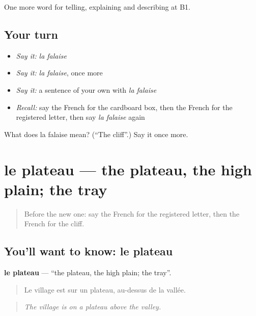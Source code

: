 \begin{grammarlens}[title={What you've built}]
One more word for telling, explaining and describing at B1.
\end{grammarlens}

\subsection*{Your turn}
\begin{itemize}
\raggedright
  \item \emph{Say it:} \emph{la falaise}
  \item \emph{Say it:} \emph{la falaise}, once more
  \item \emph{Say it:} a sentence of your own with \emph{la falaise}
  \item \emph{Recall:} say the French for the cardboard box, then the French for the registered letter, then say \emph{la falaise} again
\end{itemize}

\begin{tcolorbox}[breakable,colback=teal!4,colframe=teal!35!black,title={Before you move on}]
What does la falaise mean? (\textquotedblleft{}The cliff\textquotedblright{}.) Say it once more.
\end{tcolorbox}
\section[le plateau]{le plateau — the plateau, the high plain; the tray}

\label{lesson:FR-C454-plateau}



\begin{quote}
Before the new one: say the French for the registered letter, then the French for the cliff.
\end{quote}

\subsection*{You'll want to know: le plateau}
\textbf{le plateau} — \textquotedblleft{}the plateau, the high plain; the tray\textquotedblright{}.

\begin{quote}
Le village est sur un plateau, au-dessus de la vallée.
\end{quote}

\begin{quote}
\emph{The village is on a plateau above the valley.}
\end{quote}

